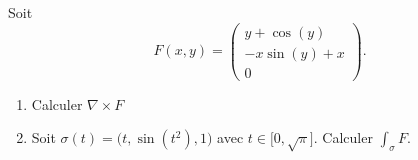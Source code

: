 
\begin{exercice}\label{exoOutilsMath-0134}

    Soit 
    \begin{equation}
        F(x,y)=\begin{pmatrix}
            y+\cos(y)    \\ 
            -x\sin(y)+x    \\ 
            0    
        \end{pmatrix}.
    \end{equation}
    \begin{enumerate}
        \item
            Calculer \( \nabla\times F\)
        \item
            Soit \( \sigma(t)=\big( t,\sin(t^2),1 \big)\) avec \( t\in\mathopen[ 0 , \sqrt{\pi} \mathclose]\). Calculer \( \int_{\sigma}F\).
    \end{enumerate}

\end{exercice}
